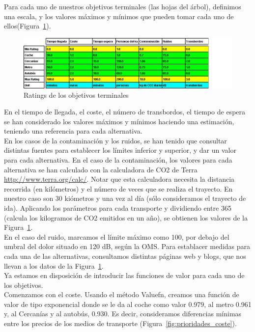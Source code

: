 \documentclass[12pt,a4paper,twoside,openright,titlepage,final]{article}
\begin{document}
Para cada uno de nuestros objetivos terminales (las hojas del árbol), definimos una escala, y los valores máximos y mínimos que pueden tomar cada uno de ellos(Figura~\ref{fig:ratings}).\\

\begin{figure}[tbph!]
	\centering
	\includegraphics[width=\linewidth]{imagenes/ratings}
	\caption{Ratings de los objetivos terminales}
	\label{fig:ratings}
\end{figure}

En el tiempo de llegada, el coste, el número de transbordos, el tiempo de espera se han considerado los valores máximos y mínimos haciendo una estimación, teniendo una referencia para cada alternativa.\\

En los casos de la contaminación y los ruidos, se han tenido que consultar distintas fuentes para establecer los límites inferior y superior, y dar un valor para cada alternativa. En el caso de la contaminación, los valores para cada alternativa se han calculado con la calculadora de CO2 de Terra \url{http://www.terra.org/calc/}. Notar que esta calculadora necesita la distancia recorrida (en kilómetros) y el número de veces que se realiza el trayecto. En nuestro caso son 30 kiómetros y una vez al día (sólo consideramos el trayecto de ida). Aplicando los parámetros para cada transporte y dividiendo entre 365 (calcula los kilogramos de CO2 emitidos en un año), se obtienen los valores de la Figura~\ref{fig:ratings}.\\

En el caso del ruido, marcamos el límite máximo como 100, por debajo del umbral del dolor situado en 120 dB, según la OMS. Para establacer medidas para cada una de las alternativas, consultamos distintas páginas web y blogs, que nos llevan a los datos de la Figura~\ref{fig:ratings}.\\

Ya estamos en disposición de introducir las funciones de valor para cada uno de los objetivos.\\

Comenzamos con el coste. Usando el método Valuefn, creamos una función de valor de tipo exponencial donde se le da al coche como valor 0.979, al metro 0.961 y, al Cercanías y al autobús, 0.930. Es decir, consideramos diferencias mínimas entre los precios de los medios de transporte (Figura~\ref{fig:prioridades_coste}).\\
\end{document}

